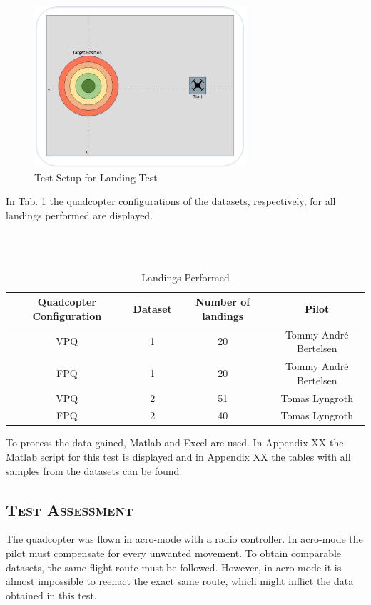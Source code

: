 \begin{figure}[H]
    \centering
    \includegraphics[width = 0.7\textwidth]{VAPIQ-PICTURES/landingtest}
    \caption{Test Setup for Landing Test}
    \label{fig:landsetup}
\end{figure}

In Tab. \ref{tab:landingdata1} the quadcopter configurations of the datasets, respectively, for all landings performed are displayed. 

\begin{table}[H]
\caption{Landings Performed}
\\
\label{tab:landingdata1}
\centering
\
\begin{tabular}{| c | c | c | c |} 
 \hline
  Quadcopter Configuration  & Dataset & Number of landings & Pilot \\
 \hline
VPQ & 1 & 20 & Tommy André Bertelsen  \\
FPQ & 1 & 20 & Tommy André Bertelsen  \\
VPQ & 2 & 51 & Tomas Lyngroth   \\
FPQ & 2 & 40 & Tomas Lyngroth  \\
\hline
\end{tabular}
\end{table}

To process the data gained, Matlab and Excel are used. In Appendix XX the Matlab script for this test is displayed and in Appendix XX the tables with all samples from the datasets can be found.

\subsection{\textsc{\medium Test Assessment}}
The quadcopter was flown in acro-mode with a radio controller. In acro-mode the pilot must compensate for every unwanted movement. To obtain comparable datasets, the same flight route must be followed. However, in acro-mode it is almost impossible to reenact the exact same route, which might inflict the data obtained in this test.   \bigskip


